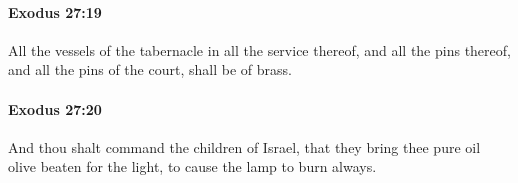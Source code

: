 		\paragraph{Exodus 27:19} %
			\label{EXODUS-27-19}

			All the vessels of the tabernacle in all the service thereof, and all the pins thereof, and all the pins of the court, shall be of brass.


		\paragraph{Exodus 27:20} %
			\label{EXODUS-27-20}

			And thou shalt command the children of Israel, that they bring thee pure oil olive beaten for the light, to cause the lamp to burn always.


